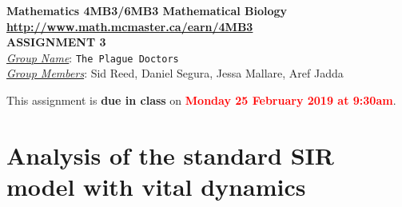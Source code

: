 \documentclass[12pt]{article}\usepackage[]{graphicx}\usepackage[]{color}
\begin{document}
\begin{center}
{\bf Mathematics 4MB3/6MB3 Mathematical Biology\\
\smallskip
\url{http://www.math.mcmaster.ca/earn/4MB3}\\
 ASSIGNMENT 3}\\
\medskip
\underline{\emph{Group Name}}: \texttt{{\color{blue}The Plague Doctors}}\\
\medskip
\underline{\emph{Group Members}}: {\color{blue}Sid Reed, Daniel Segura, Jessa Mallare, Aref Jadda}
\end{center}
\bigskip
\noindent
This assignment is {\bfseries\color{red} due in class} on \textcolor{red}{\bf Monday 25 February 2019 at 9:30am}.
\bigskip

\section*{Analysis of the standard SIR model with vital dynamics}
\SIRintro
\end{document}
